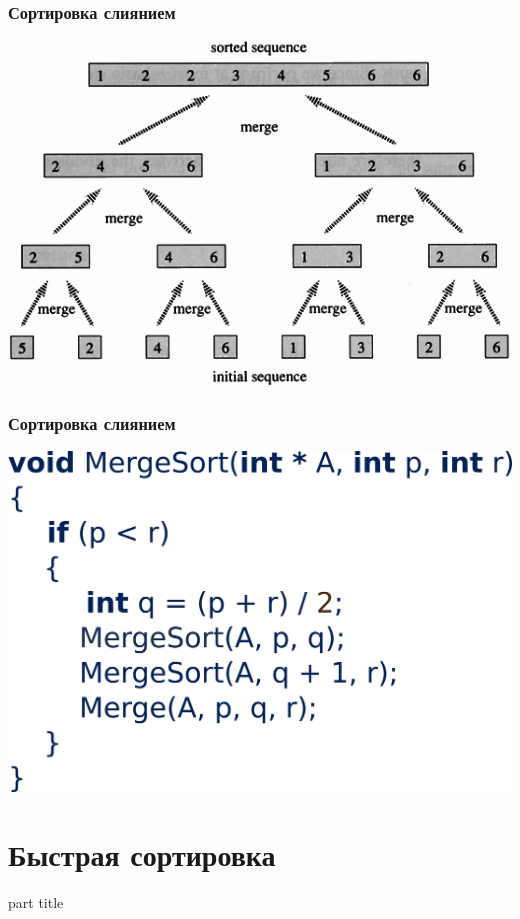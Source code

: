 \documentclass[14pt,pdf,hyperref={unicode}]{beamer}
\begin{document}
\begin{frame}[fragile]
\frametitle{Сортировка слиянием} 
\begin{center}
\includegraphics[width=0.9\linewidth]{images/mergeSort.png}
\end{center}
\end{frame}


\begin{frame}[fragile]
\frametitle{Сортировка слиянием} 
\begin{center}
\includegraphics[width=0.9\linewidth]{images/mergeSort_pseudo.png}
\end{center}
\end{frame}



\section{Быстрая сортировка}
\begin{frame}
\begin{center}
\begin{beamercolorbox}[sep=8pt,center]{part
title}
\insertsection
\end{beamercolorbox}
\end{center}
\end{frame}
\end{document}

